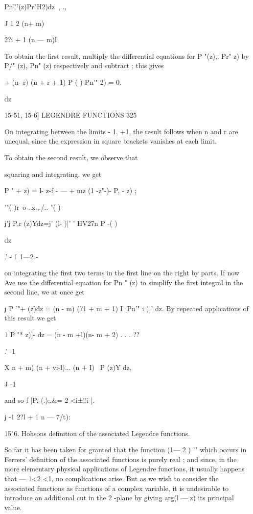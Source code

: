 {{{Pn'''(z)Pr"H2)dz\ , .,

J 1 2 (n+ m)\

2?i + 1 (n — m)l

To obtain the first result, multiply the differential equations for P
"(z),. Pr" z) by P/" (z), Pn" (z) respectively and subtract ; this
gives

+ (n- r) (n + r + 1) P ( ) Pn'" 2) = 0.

dz

15-51, 15-6] LEGENDRE FUNCTIONS 325

On integrating between the limits - 1, +1, the result follows when n
and r are unequal, since the expression in square brackets vanishes at
each limit.

To obtain the second result, we observe that

squaring and integrating, we get

P " + z) = l- z-f - — + mz (1 -z"-)- P, - z) ;

  '"( )r\ o-..z.,./.. "( )

j'j P,r (z)Ydz=j' (l- )|' ' HV27n P -( )

dz

.' - 1 1—2 -

on integrating the first two terms in the first line on the right by
parts. If now Ave use the differential equation for Pn " (z) to
simplify the first integral in the second line, we at once get

j P '"+ (z)\' dz = (n - m) (71 + m + 1) I [Pn'" i )]' dz. By repeated
applications of this result we get

1 P "* z)]- dz = (n - m +l)(n- m + 2) . . . ??

.' -1

X n + m) (n + vi-l)... (n + I) \ P (z)Y dz,

J -1

and so f |P.-(.);.\&= 2 <i±!!i |.

j -1 2?l + 1 n — 7/t):

15"6. Hohsons definition of the associated Legendre functions.

So far it has been taken for granted that the function (1— 2 ) '"
which occurs in Ferrers' definition of the associated functions is
purely real ; and since, in the more elementary physical applications
of Legendre functions, it usually happens that — 1<2 <1, no
complications arise. But as we wish to consider the associated
functions as functions of a complex variable, it is undesirable to
introduce an additional cut in the 2 -plane by giving arg(l — z) its
principal value.

}}}
